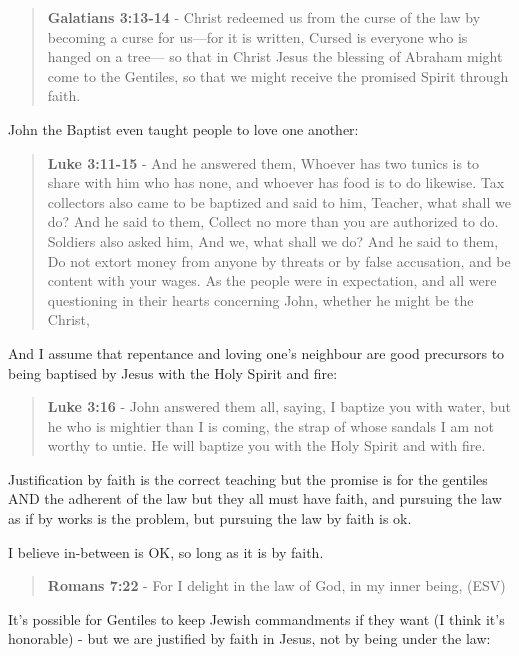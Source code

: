 \documentclass[11pt]{article}
\begin{document}
\begin{quote}
\textbf{Galatians 3:13-14} - Christ redeemed us from the curse of the law by becoming a curse for us—for it is written, Cursed is everyone who is hanged on a tree— so that in Christ Jesus the blessing of Abraham might come to the Gentiles, so that we might receive the promised Spirit through faith.
\end{quote}

John the Baptist even taught people to love one another:

\begin{quote}
\textbf{Luke 3:11-15} - And he answered them, Whoever has two tunics is to share with him who has none, and whoever has food is to do likewise. Tax collectors also came to be baptized and said to him, Teacher, what shall we do? And he said to them, Collect no more than you are authorized to do. Soldiers also asked him, And we, what shall we do? And he said to them, Do not extort money from anyone by threats or by false accusation, and be content with your wages. As the people were in expectation, and all were questioning in their hearts concerning John, whether he might be the Christ,
\end{quote}

And I assume that repentance and loving one's neighbour are good precursors to being baptised by Jesus with the Holy Spirit and fire:

\begin{quote}
\textbf{Luke 3:16} - John answered them all, saying, I baptize you with water, but he who is mightier than I is coming, the strap of whose sandals I am not worthy to untie. He will baptize you with the Holy Spirit and with fire.
\end{quote}

Justification by faith is the correct teaching but the promise is for the gentiles AND the adherent of the law but they all must have faith, and pursuing the law as if by works is the problem, but pursuing the law by faith is ok.

I believe in-between is OK, so long as it is by faith.

\begin{quote}
\textbf{Romans 7:22} - For I delight in the law of God, in my inner being, (ESV)
\end{quote}

It's possible for Gentiles to keep Jewish commandments if they want (I think it's honorable) - but we are justified by faith in Jesus, not by being under the law:
\end{document}
